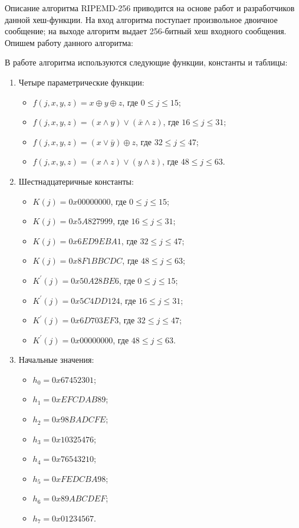 \documentclass{./civarticle}
\begin{document}
Описание алгоритма RIPEMD-256 приводится на основе работ \cite{ripemd1} и \cite{ripemd2} разработчиков данной хеш-функции. На вход алгоритма поступает произвольное двоичное сообщение; на выходе алгоритм выдает 256-битный хеш входного сообщения. Опишем работу данного алгоритма:


В работе алгоритма используются следующие функции, константы и таблицы:
\begin{enumerate}
    \item Четыре параметрические функции:

    \begin{itemize}
        \item $f(j, x, y, z) = x \oplus y \oplus z$, где $0 \leq j \leq 15$;
        \item $f(j, x, y, z) = (x \wedge y) \vee (\bar x \wedge z)$, где $16 \leq j \leq 31$;
        \item $f(j, x, y, z) = (x \vee \bar y) \oplus z$, где $32 \leq j \leq 47$;
        \item $f(j, x, y, z) = (x \wedge z) \vee (y \wedge \bar z)$, где $48 \leq j \leq 63$.
    \end{itemize}

    \item Шестнадцатеричные константы:

    \begin{itemize}
        \item $K(j) = 0x00000000$, где $0 \leq j \leq 15$;
        \item $K(j) = 0x5A827999$, где $16 \leq j \leq 31$;
        \item $K(j) = 0x6ED9EBA1$, где $32 \leq j \leq 47$;
        \item $K(j) = 0x8F1BBCDC$, где $48 \leq j \leq 63$;
        \item $K^{'}(j) = 0x50A28BE6$, где $0 \leq j \leq 15$;
        \item $K^{'}(j) = 0x5C4DD124$, где $16 \leq j \leq 31$;
        \item $K^{'}(j) = 0x6D703EF3$, где $32 \leq j \leq 47$;
        \item $K^{'}(j) = 0x00000000$, где $48 \leq j \leq 63$.
    \end{itemize}

    \item Начальные значения:

    \begin{itemize}
        \item $h_0 = 0x67452301$; 
        \item $h_1 = 0xEFCDAB89$; 
        \item $h_2 = 0x98BADCFE$; 
        \item $h_3 = 0x10325476$;
        \item $h_4 = 0x76543210$;
        \item $h_5 = 0xFEDCBA98$; 
        \item $h_6 = 0x89ABCDEF$;
        \item $h_7 = 0x01234567$.
    \end{itemize}


\end{enumerate}
\end{document}
